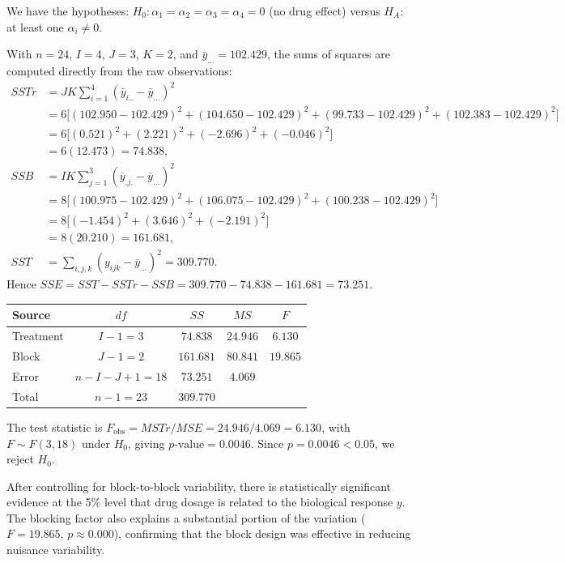 \documentclass[letterpaper]{article}
\begin{document}
			We have the {hypotheses:}
			$H_0: \alpha_1 = \alpha_2 = \alpha_3 = \alpha_4 = 0$ (no drug effect)
			versus $H_A:$ at least one $\alpha_i \neq 0$.
			
			With $n=24$, $I=4$, $J=3$, $K=2$, and $\bar{y}_{...} = 102.429$,
			the sums of squares are computed directly from the raw observations:
			\begin{align*}
				SSTr &= JK\sum_{i=1}^4 (\bar{y}_{i..}-\bar{y}_{...})^2 \\
				&= 6\bigl[(102.950-102.429)^2+(104.650-102.429)^2
				+(99.733-102.429)^2+(102.383-102.429)^2\bigr] \\
				&= 6\bigl[(0.521)^2+(2.221)^2+(-2.696)^2+(-0.046)^2\bigr] \\
				&= 6(12.473) = 74.838, \\
				SSB  &= IK\sum_{j=1}^3 (\bar{y}_{.j.}-\bar{y}_{...})^2 \\
				&= 8\bigl[(100.975-102.429)^2+(106.075-102.429)^2
				+(100.238-102.429)^2\bigr] \\
				&= 8\bigl[(-1.454)^2+(3.646)^2+(-2.191)^2\bigr] \\
				&= 8(20.210) = 161.681, \\
				SST  &= \sum_{i,j,k}(y_{ijk}-\bar{y}_{...})^2 = 309.770.
			\end{align*}
			Hence $SSE = SST - SSTr - SSB = 309.770 - 74.838 - 161.681 = 73.251$.
			
			\begin{center}
				\begin{tabular}{lcccc}
					\hline
					Source     & $df$           & $SS$      & $MS$     & $F$    \\
					\hline
					Treatment  & $I-1 = 3$      & $74.838$  & $24.946$ & $6.130$ \\
					Block      & $J-1 = 2$      & $161.681$ & $80.841$ & $19.865$ \\
					Error      & $n-I-J+1 = 18$ & $73.251$  &  $4.069$ &         \\
					\hline
					Total      & $n-1 = 23$     & $309.770$ &          &         \\
					\hline
				\end{tabular}
			\end{center}
			
			The test statistic is $F_{\mathrm{obs}} = MSTr/MSE = 24.946/4.069 = 6.130$,
			with $F \sim F(3,18)$ under $H_0$, giving $p\text{-value} = 0.0046$. Since $p = 0.0046 < 0.05$, we reject $H_0$.
			
			After controlling for block-to-block variability, there is statistically
			significant evidence at the 5\% level that drug dosage is related to the
			biological response $y$. The blocking factor also explains a substantial
			portion of the variation ($F = 19.865$, $p \approx 0.000$), confirming
			that the block design was effective in reducing nuisance variability.
			
\end{document}

